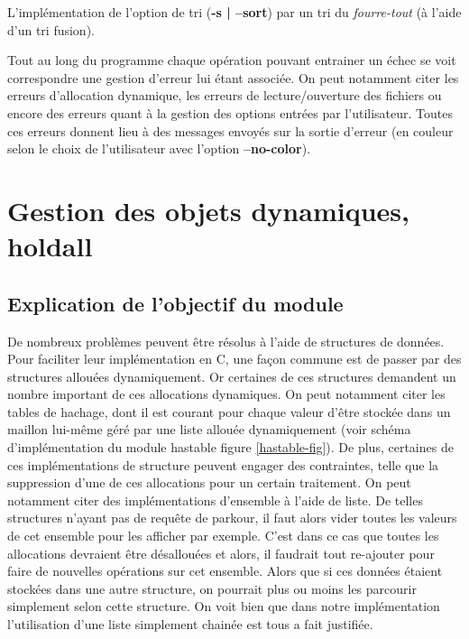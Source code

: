 \documentclass[12pt]{article}
\begin{document}
    L'implémentation de l'option de tri (\textbf{-s | --sort}) par un tri du 
    \textit{fourre-tout} (à l'aide d'un tri fusion).

    Tout au long du programme chaque opération pouvant entrainer un échec se 
    voit correspondre une gestion d'erreur lui étant associée. On peut notamment 
    citer les erreurs d'allocation dynamique, les erreurs de lecture/ouverture des 
    fichiers ou encore des erreurs quant à la gestion des options entrées par 
    l'utilisateur. Toutes ces erreurs donnent lieu à des messages envoyés sur la 
    sortie d'erreur (en couleur selon le choix de l'utilisateur avec l'option 
    \textbf{--no-color}).

    \newpage

    \section{Gestion des objets dynamiques, holdall}\label{holdall}

    \subsection{Explication de l'objectif du module}
    
    De nombreux problèmes peuvent être résolus à l'aide de structures de données. 
    Pour faciliter leur implémentation en C, une façon commune est de passer par 
    des structures allouées dynamiquement. Or certaines de ces structures 
    demandent un nombre important de ces allocations dynamiques. On peut 
    notamment citer les tables de hachage, dont il est courant pour chaque valeur 
    d'être stockée dans un maillon lui-même géré par une liste allouée 
    dynamiquement (voir schéma d'implémentation du module hastable figure 
    \ref{hastable-fig}). De plus, certaines de ces implémentations de structure 
    peuvent engager des contraintes, telle que la suppression d'une de ces 
    allocations pour un certain traitement. On peut notamment citer des 
    implémentations d'ensemble à l'aide de liste. De telles structures n'ayant 
    pas de requête de parkour, il faut alors vider toutes les valeurs de cet 
    ensemble pour les afficher par exemple. C'est dans ce cas que toutes les 
    allocations devraient être désallouées et alors, il  faudrait tout
    re-ajouter pour faire de nouvelles opérations sur cet ensemble. Alors que si 
    ces données étaient stockées dans une autre structure, on pourrait plus ou 
    moins les parcourir simplement selon cette structure. On voit bien que dans 
    notre implémentation l'utilisation d'une liste simplement chainée est tous a 
    fait justifiée.
\end{document}
